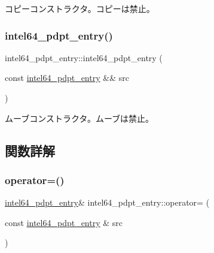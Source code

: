 コピーコンストラクタ。コピーは禁止。 \hypertarget{classintel64__pdpt__entry_a9385e9a2093e34b07499173da97ac2f6}{}\label{classintel64__pdpt__entry_a9385e9a2093e34b07499173da97ac2f6} 
\subsubsection{\texorpdfstring{intel64\+\_\+pdpt\+\_\+entry()}{intel64\_pdpt\_entry()}\hspace{0.1cm}{\footnotesize\ttfamily [3/3]}}
{\footnotesize\ttfamily intel64\+\_\+pdpt\+\_\+entry\+::intel64\+\_\+pdpt\+\_\+entry (\begin{DoxyParamCaption}\item[{const \hyperlink{classintel64__pdpt__entry}{intel64\+\_\+pdpt\+\_\+entry} \&\&}]{src }\end{DoxyParamCaption})\hspace{0.3cm}{\ttfamily [delete]}}

ムーブコンストラクタ。ムーブは禁止。 

\subsection{関数詳解}
\hypertarget{classintel64__pdpt__entry_aadd1bbb0bbd4a6d4b12e6a5303c0da0c}{}\label{classintel64__pdpt__entry_aadd1bbb0bbd4a6d4b12e6a5303c0da0c} 
\subsubsection{\texorpdfstring{operator=()}{operator=()}\hspace{0.1cm}{\footnotesize\ttfamily [1/2]}}
{\footnotesize\ttfamily \hyperlink{classintel64__pdpt__entry}{intel64\+\_\+pdpt\+\_\+entry}\& intel64\+\_\+pdpt\+\_\+entry\+::operator= (\begin{DoxyParamCaption}\item[{const \hyperlink{classintel64__pdpt__entry}{intel64\+\_\+pdpt\+\_\+entry} \&}]{src }\end{DoxyParamCaption})\hspace{0.3cm}{\ttfamily [delete]}}

